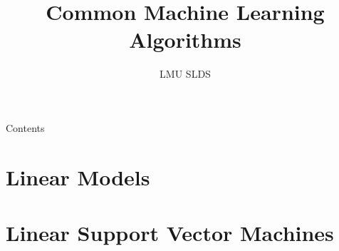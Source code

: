 




\title{Common Machine Learning Algorithms}
\author{LMU SLDS}
\date{}

\newcommand{\titlefigure}{figure_man/mckenzie_ai}
\newcommand{\titlefiguresize}{0.6}
\newcommand{\titlefiguresource}{https://www.vpnsrus.com/}







\lecturechapter{}

\begin{frame}{Contents}
  \tableofcontents
\end{frame}

\footnotesize

\section{Linear Models}


% 

\section{Linear Support Vector Machines}


